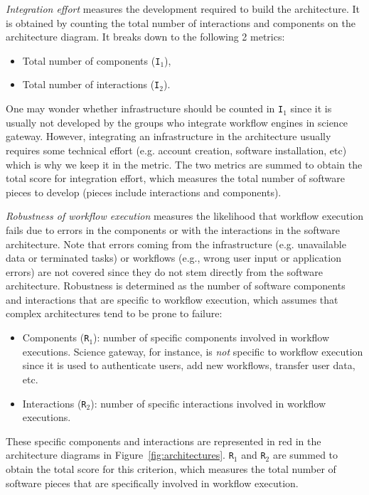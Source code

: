\documentclass[preprint,3p,twocolumn]{elsarticle}
\begin{document}
\emph{Integration effort} measures the development required to build
the architecture. It is obtained by counting the total number of
interactions and components on the architecture diagram. It breaks
down to the following 2 metrics:
\begin{itemize}[leftmargin=0cm,itemindent=0.35cm,itemsep=0cm]
\item Total number of components (\texttt{I$_1$}),
\item Total number of interactions (\texttt{I$_2$}).
\end{itemize}
One may wonder whether infrastructure should be counted in
\texttt{I$_1$} since it is usually not developed by the groups who
integrate workflow engines in science gateway. However, integrating an
infrastructure in the architecture usually requires some technical
effort (e.g. account creation, software installation, etc) which is
why we keep it in the metric. The two metrics are summed to obtain the
total score for integration effort, which measures the total number of
software pieces to develop (pieces include interactions and
components).

\emph{Robustness of workflow execution} measures the likelihood that
workflow execution fails due to errors in the components or with the
interactions in the software architecture. Note that errors coming
from the infrastructure (e.g. unavailable data or terminated tasks) or
workflows (e.g., wrong user input or application errors) are not
covered since they do not stem directly from the software
architecture. Robustness is determined as the number of software
components and interactions that are specific to workflow execution,
which assumes that complex architectures tend to be prone to failure:
\begin{itemize}[leftmargin=0cm,itemindent=0.35cm,itemsep=0cm]
\item Components (\texttt{R$_1$}): number of specific components
  involved in workflow executions. Science
gateway, for instance, is \emph{not} specific to workflow execution
since it is used to authenticate users, add new workflows, transfer
user data, etc.
\item Interactions (\texttt{R$_2$}): number of specific interactions
  involved in workflow executions.
\end{itemize}
These specific components and interactions are represented in red in
the architecture diagrams in
Figure~\ref{fig:architectures}. \texttt{R$_1$} and \texttt{R$_2$}  are summed to obtain the total score for this
criterion, which measures the total number of software pieces that are
specifically involved in workflow execution.
\end{document}

